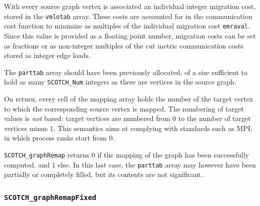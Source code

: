 \begin{itemize}
With every source graph vertex is associated an individual integer
migration cost, stored in the {\tt vmlotab} array. These costs are
accounted for in the communication cost function to minimize as
multiples of the individual migration cost {\tt emraval}. Since this
value is provided as a floating point number, migration costs can be
set as fractions or as non-integer multiples of the cut metric
communication costs stored as integer edge loads.

The {\tt parttab} array should have been previously allocated, of a
size sufficient to hold as many {\tt SCOTCH\_\lbt Num} integers as
there are vertices in the source graph.

On return, every cell of the mapping array holds the number of the
target vertex to which the corresponding source vertex is mapped.
The numbering of target values is {\em not\/} based: target vertices
are numbered from $0$ to the number of target vertices minus $1$.
This semantics aims at complying with standards such as MPI, in
which process ranks start from $0$.

\progret

{\tt SCOTCH\_graphRemap} returns $0$ if the mapping of the graph has
been successfully computed, and $1$ else. In this last case, the
{\tt parttab} array may however have been partially or completely
filled, but its contents are not significant.
\end{itemize}

\subsubsection{{\tt SCOTCH\_graphRemapFixed}}
\label{sec-lib-func-graphremapfixed}

